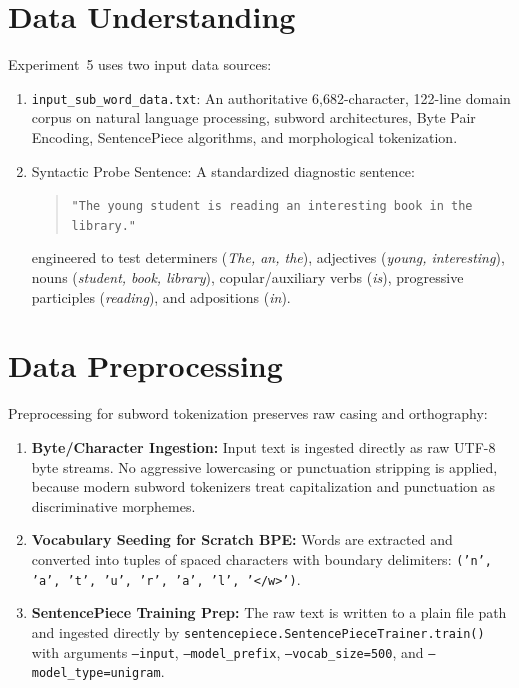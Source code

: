 \section{Data Understanding}
Experiment~5 uses two input data sources:
\begin{enumerate}
    \item \texttt{input\_sub\_word\_data.txt}: An authoritative 6,682-character, 122-line domain corpus on natural language processing, subword architectures, Byte Pair Encoding, SentencePiece algorithms, and morphological tokenization.
    \item Syntactic Probe Sentence: A standardized diagnostic sentence:
    \begin{quote}
    \texttt{"The young student is reading an interesting book in the library."}
    \end{quote}
    engineered to test determiners (\textit{The, an, the}), adjectives (\textit{young, interesting}), nouns (\textit{student, book, library}), copular/auxiliary verbs (\textit{is}), progressive participles (\textit{reading}), and adpositions (\textit{in}).
\end{enumerate}

\section{Data Preprocessing}
Preprocessing for subword tokenization preserves raw casing and orthography:
\begin{enumerate}
    \item \textbf{Byte/Character Ingestion:} Input text is ingested directly as raw UTF-8 byte streams. No aggressive lowercasing or punctuation stripping is applied, because modern subword tokenizers treat capitalization and punctuation as discriminative morphemes.
    \item \textbf{Vocabulary Seeding for Scratch BPE:} Words are extracted and converted into tuples of spaced characters with boundary delimiters: \texttt{('n', 'a', 't', 'u', 'r', 'a', 'l', '</w>')}.
    \item \textbf{SentencePiece Training Prep:} The raw text is written to a plain file path and ingested directly by \texttt{sentencepiece.SentencePieceTrainer.train()} with arguments \texttt{--input}, \texttt{--model\_prefix}, \texttt{--vocab\_size=500}, and \texttt{--model\_type=unigram}.
\end{enumerate}

